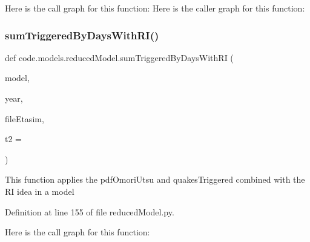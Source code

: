 Here is the call graph for this function\+:
Here is the caller graph for this function\+:
\mbox{\label{namespacecode_1_1models_1_1reduced_model_a4a56ac6217f3091da455778217429040}} 
\subsubsection{\texorpdfstring{sum\+Triggered\+By\+Days\+With\+R\+I()}{sumTriggeredByDaysWithRI()}}
{\footnotesize\ttfamily def code.\+models.\+reduced\+Model.\+sum\+Triggered\+By\+Days\+With\+RI (\begin{DoxyParamCaption}\item[{}]{model,  }\item[{}]{year,  }\item[{}]{file\+Etasim,  }\item[{}]{t2 = {} }\end{DoxyParamCaption})}

\begin{DoxyVerb}This function applies the pdfOmoriUtsu and quakesTriggered combined with the RI idea in a model
\end{DoxyVerb}
 

Definition at line 155 of file reduced\+Model.\+py.

Here is the call graph for this function\+:
